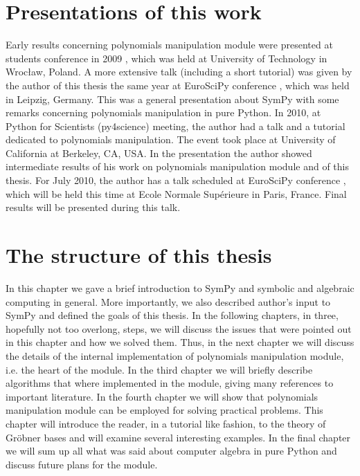 \section{Presentations of this work}

Early results concerning polynomials manipulation module were presented at students conference in
2009 \cite{KNS2009}, which was held at University of Technology in Wrocław, Poland. A more extensive
talk (including a short tutorial) was given by the author of this thesis the same year at EuroSciPy
conference \cite{EuroSciPy2009}, which was held in Leipzig, Germany. This was a general presentation
about SymPy with some remarks concerning polynomials manipulation in pure Python. In 2010, at Python
for Scientists (py4science) meeting, the author had a talk and a tutorial \cite{Py4Science2010} dedicated
to polynomials manipulation. The event took place at University of California at Berkeley, CA, USA. In
the presentation the author showed intermediate results of his work on polynomials manipulation module
and of this thesis. For July 2010, the author has a talk scheduled at EuroSciPy conference \cite{EuroSciPy2010},
which will be held this time at Ecole Normale Supérieure in Paris, France. Final results will be presented
during this talk.


\section{The structure of this thesis}

In this chapter we gave a brief introduction to SymPy and symbolic and algebraic computing in general.
More importantly, we also described author's input to SymPy and defined the goals of this thesis. In
the following chapters, in three, hopefully not too overlong, steps, we will discuss the issues that
were pointed out in this chapter and how we solved them. Thus, in the next chapter we will discuss
the details of the internal implementation of polynomials manipulation module, i.e. the heart of the
module. In the third chapter we will briefly describe algorithms that where implemented in the module,
giving many references to important literature. In the fourth chapter we will show that polynomials
manipulation module can be employed for solving practical problems. This chapter will introduce the
reader, in a tutorial like fashion, to the theory of Gröbner bases and will examine several
interesting examples. In the final chapter we will sum up all what was said about computer algebra
in pure Python and discuss future plans for the module.


